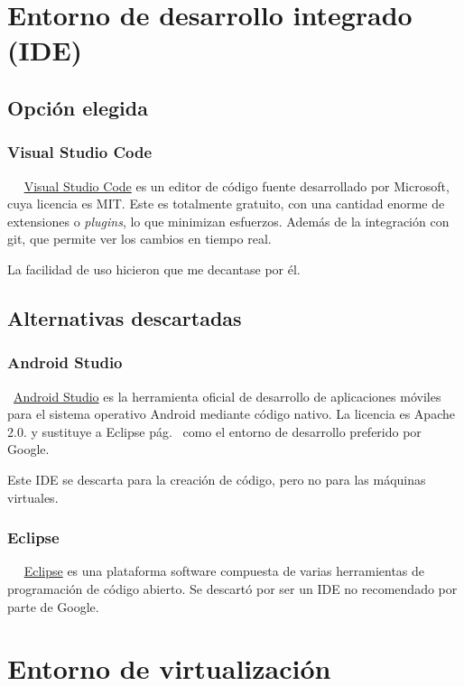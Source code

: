 \section{Entorno de desarrollo integrado (IDE)}

\subsection{Opción elegida}

\subsubsection{Visual Studio Code}~\label{visual}
~\href{https://code.visualstudio.com/}{Visual Studio Code} es un editor de código fuente desarrollado por Microsoft, cuya licencia es MIT. Este es totalmente gratuito, con una cantidad enorme de extensiones o \emph{plugins}, lo que minimizan esfuerzos. Además de la integración con git, que permite ver los cambios en tiempo real. 

La facilidad de uso hicieron que me decantase por él.

\subsection{Alternativas descartadas}

\subsubsection{Android Studio}\label{androidstudio}
~\href{https://developer.android.com/studio}{Android Studio} es la herramienta oficial de desarrollo de aplicaciones móviles para el sistema operativo Android mediante código nativo. La licencia es Apache 2.0. y sustituye a Eclipse pág.~\pageref{eclipse} como el entorno de desarrollo preferido por Google.

Este IDE se descarta para la creación de código, pero no para las máquinas virtuales.

\subsubsection{Eclipse}~\label{eclipse}
~\href{https://www.eclipse.org/}{Eclipse} es una plataforma software compuesta de varias herramientas de programación de código abierto. Se descartó por ser un IDE no recomendado por parte de Google.

\section{Entorno de virtualización}


